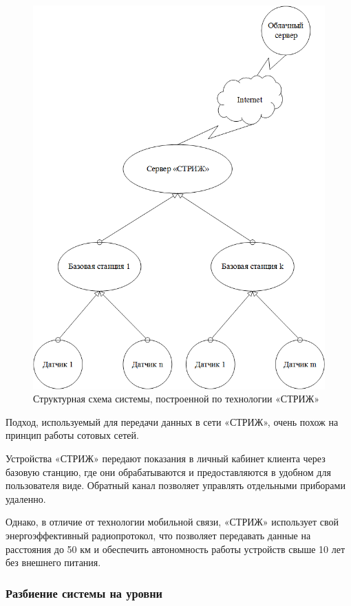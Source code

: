 \begin{figure}[H]
	\centering\includegraphics[width=0.7\linewidth]{img/Swift}
	\caption{Структурная схема системы, построенной по технологии «СТРИЖ»}
	\label{fig:Swift}
\end{figure}

Подход, используемый для передачи данных в сети «СТРИЖ», очень похож на принцип работы сотовых сетей.

Устройства «СТРИЖ» передают показания в личный кабинет клиента через базовую станцию, где они обрабатываются и предоставляются в удобном для пользователя виде. Обратный канал позволяет управлять отдельными приборами удаленно\cite{2}.

Однако, в отличие от технологии мобильной связи, «СТРИЖ» использует свой энергоэффективный радиопротокол, что позволяет передавать данные на расстояния до 50 км и обеспечить автономность работы устройств свыше 10 лет без внешнего питания.


\subsubsection{Разбиение системы на уровни}

